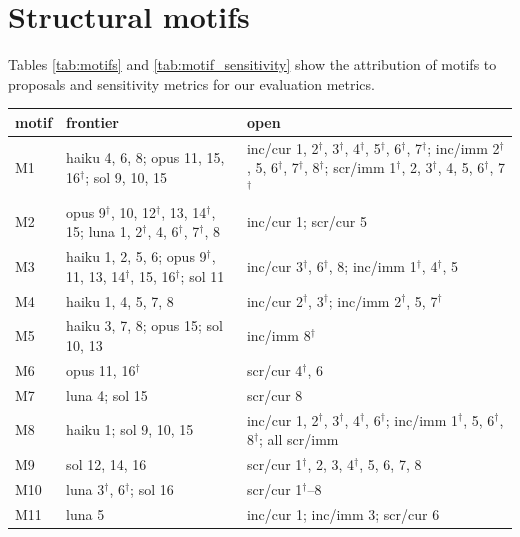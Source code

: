 \documentclass[11pt]{article}
\begin{document}
\section{Structural motifs}

Tables \ref{tab:motifs} and \ref{tab:motif_sensitivity} show the attribution of motifs to proposals and sensitivity metrics for our evaluation metrics.

\begin{table}
\centering
\small
\setlength{\tabcolsep}{4pt}
\begin{tabular}{l p{} p{}}
\toprule
motif & frontier & open \\
\midrule
M1 & haiku 4, 6, 8; opus 11, 15, 16$^{\dagger}$; sol 9, 10, 15
  & inc/cur 1, 2$^{\dagger}$, 3$^{\dagger}$, 4$^{\dagger}$, 5$^{\dagger}$, 6$^{\dagger}$, 7$^{\dagger}$; inc/imm 2$^{\dagger}$, 5, 6$^{\dagger}$, 7$^{\dagger}$, 8$^{\dagger}$; scr/imm 1$^{\dagger}$, 2, 3$^{\dagger}$, 4, 5, 6$^{\dagger}$, 7$^{\dagger}$ \\
\addlinespace
M2 & opus 9$^{\dagger}$, 10, 12$^{\dagger}$, 13, 14$^{\dagger}$, 15; luna 1, 2$^{\dagger}$, 4, 6$^{\dagger}$, 7$^{\dagger}$, 8
  & inc/cur 1; scr/cur 5 \\
\addlinespace
M3 & haiku 1, 2, 5, 6; opus 9$^{\dagger}$, 11, 13, 14$^{\dagger}$, 15, 16$^{\dagger}$; sol 11
  & inc/cur 3$^{\dagger}$, 6$^{\dagger}$, 8; inc/imm 1$^{\dagger}$, 4$^{\dagger}$, 5 \\
\addlinespace
M4 & haiku 1, 4, 5, 7, 8
  & inc/cur 2$^{\dagger}$, 3$^{\dagger}$; inc/imm 2$^{\dagger}$, 5, 7$^{\dagger}$ \\
\addlinespace
M5 & haiku 3, 7, 8; opus 15; sol 10, 13
  & inc/imm 8$^{\dagger}$ \\
\addlinespace
M6 & opus 11, 16$^{\dagger}$
  & scr/cur 4$^{\dagger}$, 6 \\
\addlinespace
M7 & luna 4; sol 15
  & scr/cur 8 \\
\addlinespace
M8 & haiku 1; sol 9, 10, 15
  & inc/cur 1, 2$^{\dagger}$, 3$^{\dagger}$, 4$^{\dagger}$, 6$^{\dagger}$; inc/imm 1$^{\dagger}$, 5, 6$^{\dagger}$, 8$^{\dagger}$; all scr/imm \\
\addlinespace
M9 & sol 12, 14, 16
  & scr/cur 1$^{\dagger}$, 2, 3, 4$^{\dagger}$, 5, 6, 7, 8 \\
\addlinespace
M10 & luna 3$^{\dagger}$, 6$^{\dagger}$; sol 16
  & scr/cur 1$^{\dagger}$--8 \\
\addlinespace
M11 & luna 5
  & inc/cur 1; inc/imm 3; scr/cur 6 \\

\end{tabular}
\end{table}
\end{document}

